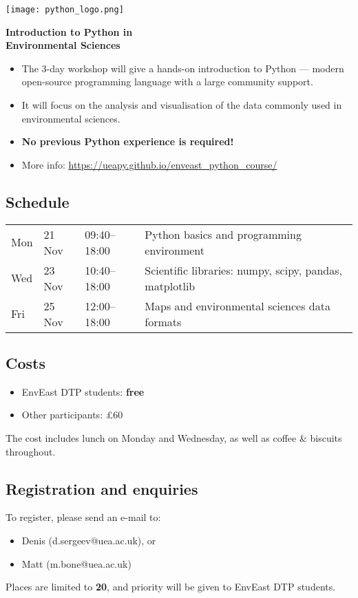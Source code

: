 \documentclass[paper=a4]{scrartcl}
\newcommand*{\pyitem}{\item [{\texttt{[image: python\_logo.png]}}]}
\begin{document}
\pagestyle{empty} %

\begin{center}
\begin{minipage}{0.2\linewidth}
    \texttt{[image: python\_logo.png]}
    \vspace{0.5cm}
\end{minipage}

\Huge \textbf{Introduction to Python in \\ Environmental Sciences}

\end{center}

\begin{itemize}
\pyitem The 3-day workshop will give a hands-on introduction to Python --- modern open-source programming language with a large community support.
\pyitem It will focus on the analysis and visualisation of the data commonly used in environmental sciences.
\pyitem \textbf{No previous Python experience is required!}
\pyitem More info: \url{https://ueapy.github.io/enveast_python_course/}
\end{itemize}


\subsection*{Schedule}
\begin{center}
\begin{tabular}{llll}
Mon & 21 Nov & 09:40--18:00 & Python basics and programming environment\\
Wed & 23 Nov & 10:40--18:00 & Scientific libraries: numpy, scipy, pandas, matplotlib \\
Fri & 25 Nov & 12:00--18:00 & Maps and environmental sciences data formats\\
\end{tabular}
\end{center}


\subsection*{Costs}
\begin{itemize}
\pyitem EnvEast DTP students: \textbf{free}
\pyitem Other participants: \pounds 60
\end{itemize}
\vspace{-0.5cm}
\scriptsize The cost includes lunch on Monday and Wednesday, as well as coffee \& biscuits throughout. \normalsize

\subsection*{Registration and enquiries}
To register, please send an e-mail to:
\begin{itemize}
\pyitem Denis (d.sergeev@uea.ac.uk), or
\pyitem Matt (m.bone@uea.ac.uk)
\end{itemize}
Places are limited to \textbf{20}, and priority will be given to EnvEast DTP students.
\end{document}
